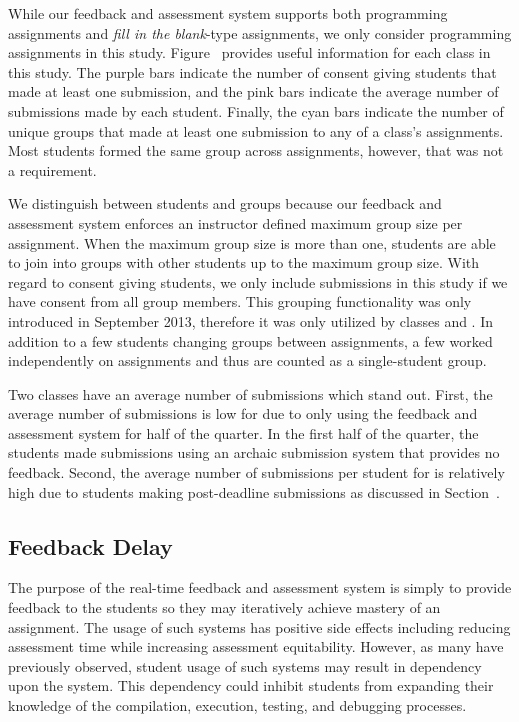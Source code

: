 While our feedback and assessment system supports both programming assignments
and \emph{fill in the blank}-type assignments, we only consider programming
assignments in this study. Figure~ provides useful
information for each class in this study. The purple bars indicate the number
of consent giving students that made at least one submission, and the pink bars
indicate the average number of submissions made by each student. Finally, the
cyan bars indicate the number of unique groups that made at least one
submission to any of a class's assignments. Most students formed the same group
across assignments, however, that was not a requirement.

We distinguish between students and groups because our feedback and assessment
system enforces an instructor defined maximum group size per assignment. When
the maximum group size is more than one, students are able to join into groups
with other students up to the maximum group size. With regard to consent giving
students, we only include submissions in this study if we have consent from all
group members. This grouping functionality was only introduced in September
2013, therefore it was only utilized by classes  and . In
addition to a few students changing groups between assignments, a few worked
independently on assignments and thus are counted as a single-student group.

Two classes have an average number of submissions which stand out. First, the
average number of submissions is low for  due to only using the
feedback and assessment system for half of the quarter. In the first half of
the quarter, the students made submissions using an archaic submission system
that provides no feedback. Second, the average number of submissions per
student for  is relatively high due to students making post-deadline
submissions as discussed in Section~.


\subsection{Feedback Delay} 
The purpose of the real-time feedback and assessment system is simply to
provide feedback to the students so they may iteratively achieve mastery of an
assignment. The usage of such systems has positive side effects including
reducing assessment time while increasing assessment equitability. However, as
many have previously observed, student usage of such systems may result in
dependency upon the system. This dependency could inhibit students from
expanding their knowledge of the compilation, execution, testing, and debugging
processes.

